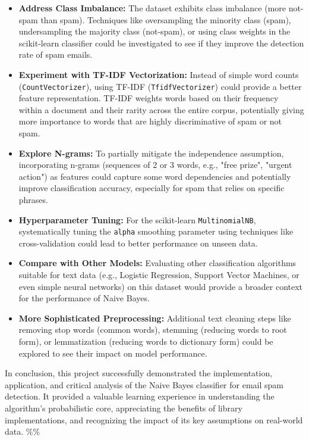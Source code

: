 \documentclass[12pt,a4paper]{article}
\begin{document}
\begin{itemize}
    \item \textbf{Address Class Imbalance:} The dataset exhibits class imbalance (more not-spam than spam). Techniques like oversampling the minority class (spam), undersampling the majority class (not-spam), or using class weights in the scikit-learn classifier could be investigated to see if they improve the detection rate of spam emails.
    \item \textbf{Experiment with TF-IDF Vectorization:} Instead of simple word counts (\texttt{CountVectorizer}), using TF-IDF (\texttt{TfidfVectorizer}) could provide a better feature representation. TF-IDF weights words based on their frequency within a document and their rarity across the entire corpus, potentially giving more importance to words that are highly discriminative of spam or not spam.
    \item \textbf{Explore N-grams:} To partially mitigate the independence assumption, incorporating n-grams (sequences of 2 or 3 words, e.g., "free prize", "urgent action") as features could capture some word dependencies and potentially improve classification accuracy, especially for spam that relies on specific phrases.
    \item \textbf{Hyperparameter Tuning:} For the scikit-learn \texttt{MultinomialNB}, systematically tuning the \texttt{alpha} smoothing parameter using techniques like cross-validation could lead to better performance on unseen data.
    \item \textbf{Compare with Other Models:} Evaluating other classification algorithms suitable for text data (e.g., Logistic Regression, Support Vector Machines, or even simple neural networks) on this dataset would provide a broader context for the performance of Naive Bayes.
    \item \textbf{More Sophisticated Preprocessing:} Additional text cleaning steps like removing stop words (common words), stemming (reducing words to root form), or lemmatization (reducing words to dictionary form) could be explored to see their impact on model performance.
\end{itemize}

In conclusion, this project successfully demonstrated the implementation, application, and critical analysis of the Naive Bayes classifier for email spam detection. It provided a valuable learning experience in understanding the algorithm's probabilistic core, appreciating the benefits of library implementations, and recognizing the impact of its key assumptions on real-world data.
\%\%
\end{document}
